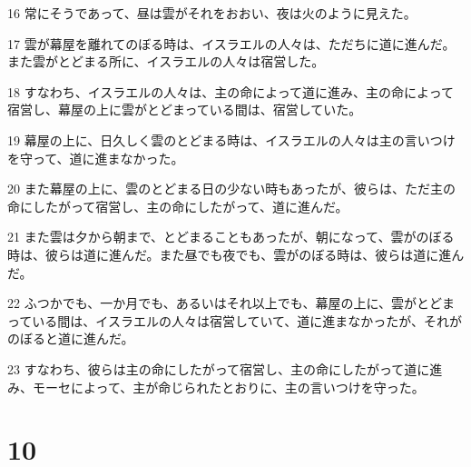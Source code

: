 \par 16 常にそうであって、昼は雲がそれをおおい、夜は火のように見えた。
\par 17 雲が幕屋を離れてのぼる時は、イスラエルの人々は、ただちに道に進んだ。また雲がとどまる所に、イスラエルの人々は宿営した。
\par 18 すなわち、イスラエルの人々は、主の命によって道に進み、主の命によって宿営し、幕屋の上に雲がとどまっている間は、宿営していた。
\par 19 幕屋の上に、日久しく雲のとどまる時は、イスラエルの人々は主の言いつけを守って、道に進まなかった。
\par 20 また幕屋の上に、雲のとどまる日の少ない時もあったが、彼らは、ただ主の命にしたがって宿営し、主の命にしたがって、道に進んだ。
\par 21 また雲は夕から朝まで、とどまることもあったが、朝になって、雲がのぼる時は、彼らは道に進んだ。また昼でも夜でも、雲がのぼる時は、彼らは道に進んだ。
\par 22 ふつかでも、一か月でも、あるいはそれ以上でも、幕屋の上に、雲がとどまっている間は、イスラエルの人々は宿営していて、道に進まなかったが、それがのぼると道に進んだ。
\par 23 すなわち、彼らは主の命にしたがって宿営し、主の命にしたがって道に進み、モーセによって、主が命じられたとおりに、主の言いつけを守った。

\chapter{10}

